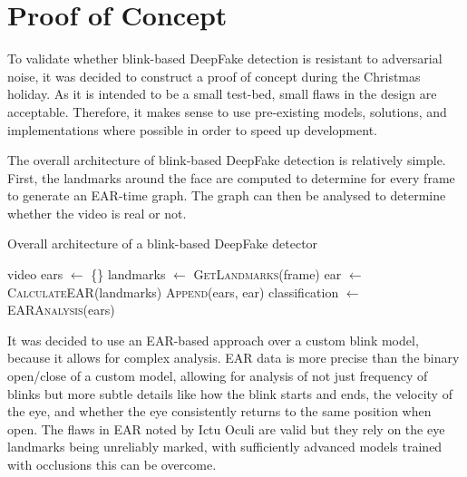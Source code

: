 \section{Proof of Concept}
\label{sec:concept-design}


To validate whether blink-based DeepFake detection is resistant to adversarial noise, it was decided to construct a proof of concept during the Christmas holiday. As it is intended to be a small test-bed, small flaws in the design are acceptable. Therefore, it makes sense to use pre-existing models, solutions, and implementations where possible in order to speed up development.

The overall architecture of blink-based DeepFake detection is relatively simple. First, the landmarks around the face are computed to determine for every frame to generate an EAR-time graph. The graph can then be analysed to determine whether the video is real or not. 

\begin{algorithm}[h]
    \caption{Overall architecture of a blink-based DeepFake detector}
    \label{alg:blink-based}
    \begin{algorithmic}
        \Require video
        \State ears $\gets$ \{\}
            \State landmarks $\gets$ \textsc{GetLandmarks}(frame)
            \State ear $\gets$ \textsc{CalculateEAR}(landmarks) 
            \State \textsc{Append}(ears, ear)
        \EndFor
        \State classification $\gets$ \textsc{EARAnalysis}(ears)
    \end{algorithmic}
\end{algorithm}

It was decided to use an EAR-based approach over a custom blink model, because it allows for complex analysis. EAR data is more precise than the binary open/close of a custom model, allowing for analysis of not just frequency of blinks but more subtle details like how the blink starts and ends, the velocity of the eye, and whether the eye consistently returns to the same position when open. The flaws in EAR noted by Ictu Oculi\cite{li2018ictu} are valid but they rely on the eye landmarks being unreliably marked, with sufficiently advanced models trained with occlusions this can be overcome. 

